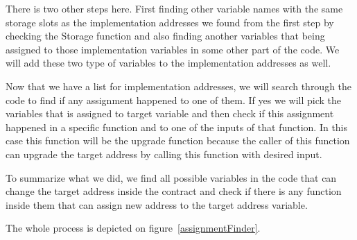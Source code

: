 There is two other steps here. First finding other variable names with the same storage slots as the implementation addresses we found from the first step by checking the Storage function and also finding another variables that being assigned to those implementation variables in some other part of the code. We will add these two type of variables to the implementation addresses as well.

Now that we have a list for implementation addresses, we will search through the code to find if any assignment happened to one of them. If yes we will pick the variables that is assigned to target variable and then check if this assignment happened in a specific function and to one of the inputs of that function. In this case this function will be the upgrade function because the caller of this function can upgrade the target address by calling this function with desired input. 

To summarize what we did, we find all possible variables in the code that can change the target address inside the contract and check if there is any function inside them that can assign new address to the target address variable.

The whole process is depicted on figure~\ref{assignmentFinder}.

